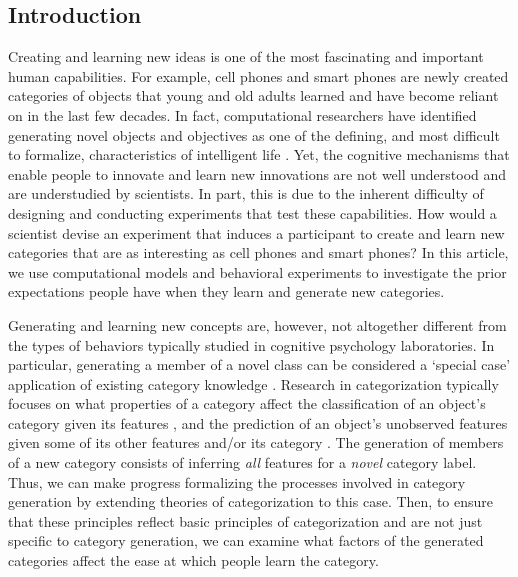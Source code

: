 \documentclass[12pt]{article}
\begin{document}
\begin{flushleft}

\section{Introduction}
\setlength\parindent{0.5in}

Creating and learning new ideas is one of the most fascinating and important
human capabilities. For example, cell phones and smart phones are newly created
categories of objects that young and old adults learned and have become reliant
on in the last few decades. In fact, computational researchers have identified
generating novel objects and objectives as one of the defining, and most
difficult to formalize, characteristics of intelligent life
\citep{lake2017,lehman2011,taylor2016}. Yet, the cognitive mechanisms that
enable people to innovate and learn new innovations are not well understood and
are understudied by scientists. In part, this is due to the inherent difficulty
of designing and conducting experiments that test these capabilities. How would
a scientist devise an experiment that induces a participant to create and learn
new categories that are as interesting as cell phones and smart phones? In this
article, we use computational models and behavioral experiments to investigate
the prior expectations people have when they learn and generate new categories.

Generating and learning new concepts are, however, not altogether different from
the types of behaviors typically studied in cognitive psychology laboratories.
In particular, generating a member of a novel class can be considered a `special
case' application of existing category knowledge
\citep{kemp2014taxonomy,kurtz2015human}. Research in categorization typically
focuses on what properties of a category affect the classification of an
object's category given its features \citep{shepard1961learning,kurtz2013human},
and the prediction of an object's unobserved features given some of its other
features and/or its category \citep{markman2003category}. The generation of
members of a new category consists of inferring {\em all} features for a {\em
novel} category label. Thus, we can make progress formalizing the processes
involved in category generation by extending theories of categorization to this
case. Then, to ensure that these principles reflect basic principles of
categorization and are not just specific to category generation, we can examine
what factors of the generated categories affect the ease at which people learn
the category.


\end{flushleft}
\end{document}
